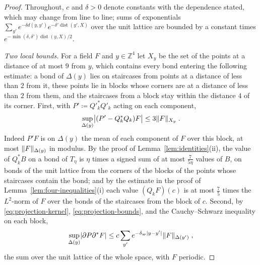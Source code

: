 \documentclass[11pt]{preprint}
\DeclarePairedDelimiter{\abs}{\lvert}{\rvert}
\DeclarePairedDelimiter{\norm}{\lVert}{\rVert}
\numberwithin{equation}{section}
\theoremstyle{definition}
\theoremstyle{remark}
\theoremstyle{plain}
\begin{document}
\begin{proof}
Throughout, $c$ and $\delta > 0$ denote constants with the dependence stated, which may change from line to line; sums of exponentials $\sum_{y'}e^{-\delta d(y, y')}e^{-\delta'\operatorname{dist}(y', X)}$ over the unit lattice are bounded by a constant times $e^{-\min(\delta, \delta')\operatorname{dist}(y, X)/2}$.

\emph{Two local bounds.} For a field $F$ and $y \in \mathbb Z^4$ let $X_y$ be the set of the points at a distance of at most $9$ from $y$, which contains every bond entering the following estimate: a bond of $\Delta(y)$ lies on staircases from points at a distance of less than $2$ from it, these points lie in blocks whose corners are at a distance of less than $2$ from them, and the staircases from a block stay within the distance $4$ of its corner. First, with $P' \coloneqq Q'^*_kQ'_k$ acting on each component,
\begin{equation}\label{eq:local-average}
    \sup_{\Delta(y)}\bigl\lvert(P' - Q_k^*Q_k)F\bigr\rvert \leq 3\norm{F}_{X_y}\;.
\end{equation}
Indeed $P'F$ is on $\Delta(y)$ the mean of each component of $F$ over this block, at most $\norm{F}_{\Delta(y)}$ in modulus. By the proof of Lemma~\ref{lem:identities}(ii), the value of $Q_k^*B$ on a bond of $T_\eta$ is $\eta$ times a signed sum of at most $\frac{7}{5\eta}$ values of $B$, on bonds of the unit lattice from the corners of the blocks of the points whose staircases contain the bond; and by the estimate in the proof of Lemma~\ref{lem:four-inequalities}(i) each value $(Q_kF)(c)$ is at most $\frac75$ times the $L^2$-norm of $F$ over the bonds of the staircases from the block of $c$. Second, by \eqref{eq:projection-kernel}, \eqref{eq:projection-bounds}, and the Cauchy--Schwarz inequality on each block,
\begin{equation}\label{eq:local-projection}
    \sup_{\Delta(y)}\abs{\partial P\partial^*F} \leq c\sum_{y'}e^{-\delta_\varpi\abs{y - y'}}\norm{F}_{\Delta(y')}\;,
\end{equation}
the sum over the unit lattice of the whole space, with $F$ periodic.


\end{proof}
\end{document}
